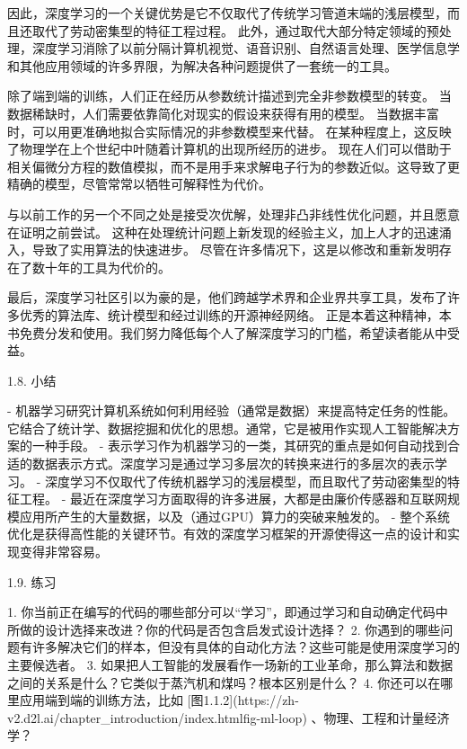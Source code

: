 因此，深度学习的一个关键优势是它不仅取代了传统学习管道末端的浅层模型，而且还取代了劳动密集型的特征工程过程。 此外，通过取代大部分特定领域的预处理，深度学习消除了以前分隔计算机视觉、语音识别、自然语言处理、医学信息学和其他应用领域的许多界限，为解决各种问题提供了一套统一的工具。

除了端到端的训练，人们正在经历从参数统计描述到完全非参数模型的转变。 当数据稀缺时，人们需要依靠简化对现实的假设来获得有用的模型。 当数据丰富时，可以用更准确地拟合实际情况的非参数模型来代替。 在某种程度上，这反映了物理学在上个世纪中叶随着计算机的出现所经历的进步。 现在人们可以借助于相关偏微分方程的数值模拟，而不是用手来求解电子行为的参数近似。这导致了更精确的模型，尽管常常以牺牲可解释性为代价。

与以前工作的另一个不同之处是接受次优解，处理非凸非线性优化问题，并且愿意在证明之前尝试。 这种在处理统计问题上新发现的经验主义，加上人才的迅速涌入，导致了实用算法的快速进步。 尽管在许多情况下，这是以修改和重新发明存在了数十年的工具为代价的。

最后，深度学习社区引以为豪的是，他们跨越学术界和企业界共享工具，发布了许多优秀的算法库、统计模型和经过训练的开源神经网络。 正是本着这种精神，本书免费分发和使用。我们努力降低每个人了解深度学习的门槛，希望读者能从中受益。

 1.8. 小结

- 机器学习研究计算机系统如何利用经验（通常是数据）来提高特定任务的性能。它结合了统计学、数据挖掘和优化的思想。通常，它是被用作实现人工智能解决方案的一种手段。
- 表示学习作为机器学习的一类，其研究的重点是如何自动找到合适的数据表示方式。深度学习是通过学习多层次的转换来进行的多层次的表示学习。
- 深度学习不仅取代了传统机器学习的浅层模型，而且取代了劳动密集型的特征工程。
- 最近在深度学习方面取得的许多进展，大都是由廉价传感器和互联网规模应用所产生的大量数据，以及（通过GPU）算力的突破来触发的。
- 整个系统优化是获得高性能的关键环节。有效的深度学习框架的开源使得这一点的设计和实现变得非常容易。

 1.9. 练习

1. 你当前正在编写的代码的哪些部分可以“学习”，即通过学习和自动确定代码中所做的设计选择来改进？你的代码是否包含启发式设计选择？
2. 你遇到的哪些问题有许多解决它们的样本，但没有具体的自动化方法？这些可能是使用深度学习的主要候选者。
3. 如果把人工智能的发展看作一场新的工业革命，那么算法和数据之间的关系是什么？它类似于蒸汽机和煤吗？根本区别是什么？
4. 你还可以在哪里应用端到端的训练方法，比如 [图1.1.2](https://zh-v2.d2l.ai/chapter\_introduction/index.htmlfig-ml-loop) 、物理、工程和计量经济学？



